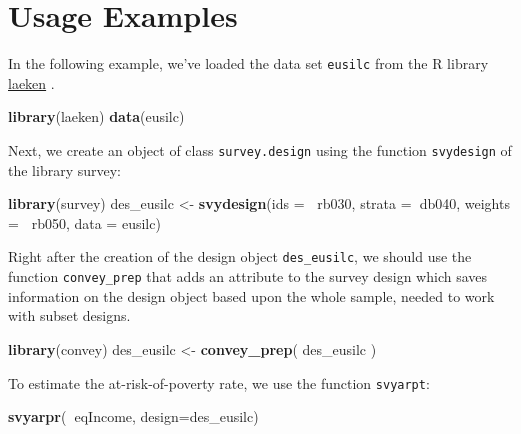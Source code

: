 \documentclass[]{book}
\newenvironment{Shaded}{\begin{snugshade}}{\end{snugshade}}
\newcommand{\DataTypeTok}[1]{\textcolor[rgb]{0.13,0.29,0.53}{#1}}
\newcommand{\KeywordTok}[1]{\textcolor[rgb]{0.13,0.29,0.53}{\textbf{#1}}}
\newcommand{\NormalTok}[1]{#1}
\newcommand{\OperatorTok}[1]{\textcolor[rgb]{0.81,0.36,0.00}{\textbf{#1}}}
\newcommand{\StringTok}[1]{\textcolor[rgb]{0.31,0.60,0.02}{#1}}
\begin{document}
\hypertarget{usage-examples}{%
\section{Usage Examples}\label{usage-examples}}

In the following example, we've loaded the data set \texttt{eusilc} from the R library \href{https://CRAN.R-project.org/package=laeken}{laeken} \citep{R-laeken}.

\begin{Shaded}
\begin{Highlighting}[]
\KeywordTok{library}\NormalTok{(laeken)}
\KeywordTok{data}\NormalTok{(eusilc)}
\end{Highlighting}
\end{Shaded}

Next, we create an object of class \texttt{survey.design} using the function \texttt{svydesign} of the library survey:

\begin{Shaded}
\begin{Highlighting}[]
\KeywordTok{library}\NormalTok{(survey)}
\NormalTok{des_eusilc <-}\StringTok{ }\KeywordTok{svydesign}\NormalTok{(}\DataTypeTok{ids =} \OperatorTok{~}\NormalTok{rb030, }\DataTypeTok{strata =}\OperatorTok{~}\NormalTok{db040,  }\DataTypeTok{weights =} \OperatorTok{~}\NormalTok{rb050, }\DataTypeTok{data =}\NormalTok{ eusilc)}
\end{Highlighting}
\end{Shaded}

Right after the creation of the design object \texttt{des\_eusilc}, we should use the function \texttt{convey\_prep} that adds an attribute to the survey design which saves information on the design object based upon the whole sample, needed to work with subset designs.

\begin{Shaded}
\begin{Highlighting}[]
\KeywordTok{library}\NormalTok{(convey)}
\NormalTok{des_eusilc <-}\StringTok{ }\KeywordTok{convey_prep}\NormalTok{( des_eusilc )}
\end{Highlighting}
\end{Shaded}

To estimate the at-risk-of-poverty rate, we use the function \texttt{svyarpt}:

\begin{Shaded}
\begin{Highlighting}[]
\KeywordTok{svyarpr}\NormalTok{(}\OperatorTok{~}\NormalTok{eqIncome, }\DataTypeTok{design=}\NormalTok{des_eusilc)}
\end{Highlighting}
\end{Shaded}
\end{document}
